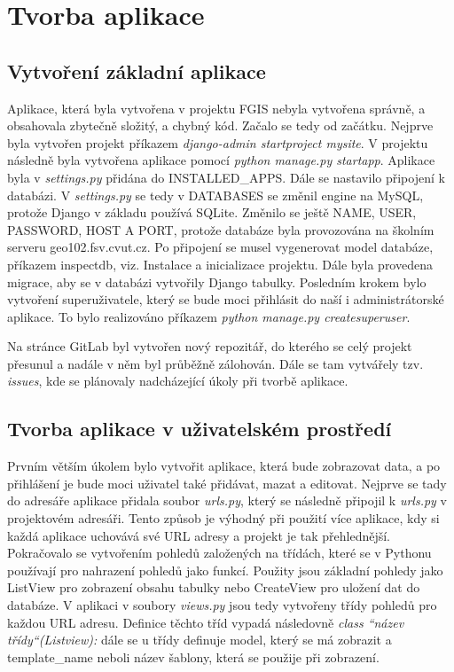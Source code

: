 \chapter{Tvorba aplikace}
\label{4-tvorba-aplikace}

\section{Vytvoření základní aplikace}

Aplikace, která byla vytvořena v projektu FGIS nebyla vytvořena
správně, a obsahovala zbytečně složitý, a chybný kód. Začalo se tedy
od začátku. Nejprve byla vytvořen projekt příkazem \emph{django-admin
  startproject mysite}. V projektu následně byla vytvořena aplikace
pomocí \emph{python manage.py startapp}. Aplikace byla v
\emph{settings.py} přidána do INSTALLED\_APPS. Dále se
nastavilo připojení k databázi. V \emph{settings.py} se tedy v
DATABASES se změnil engine na MySQL, protože Django v základu
používá SQLite. Změnilo se ještě NAME, USER, PASSWORD, HOST A PORT,
protože databáze byla provozována na školním serveru
geo102.fsv.cvut.cz. Po připojení se musel vygenerovat model databáze,
příkazem inspectdb, viz. Instalace a inicializace projektu. Dále byla
provedena migrace, aby se v databázi vytvořily Django
tabulky. Posledním krokem bylo vytvoření superuživatele, který se bude
moci přihlásit do naší i administrátorské aplikace. To bylo
realizováno příkazem \emph{python manage.py createsuperuser}.

Na stránce GitLab byl vytvořen nový repozitář, do kterého se celý
projekt přesunul a nadále v něm byl průběžně zálohován. Dále se tam
vytvářely tzv. \emph{issues}, kde se plánovaly nadcházející úkoly při
tvorbě aplikace.

\section{Tvorba aplikace v uživatelském prostředí}

Prvním větším úkolem bylo vytvořit aplikace, která bude zobrazovat
data, a po přihlášení je bude moci uživatel také přidávat, mazat a
editovat. Nejprve se tady do adresáře aplikace přidala soubor  \emph{urls.py},
který se následně připojil k \emph{urls.py} v projektovém adresáři. Tento
způsob je výhodný při použití více aplikace, kdy si každá aplikace
uchovává své URL adresy a projekt je tak přehlednější. Pokračovalo se
vytvořením pohledů založených na třídách, které se v Pythonu používají
pro nahrazení pohledů jako funkcí. Použity jsou základní pohledy jako
ListView pro zobrazení obsahu tabulky nebo CreateView pro uložení dat
do databáze. V aplikaci v soubory \emph{views.py} jsou tedy vytvořeny
třídy pohledů pro každou URL adresu. Definice těchto tříd vypadá
následovně \emph{class “název třídy“(Listview):} dále se u třídy
definuje model, který se má zobrazit a template\_name neboli název
šablony, která se použije při zobrazení.

